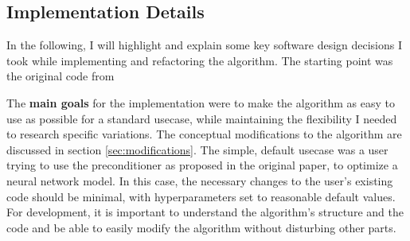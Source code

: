 \documentclass[twoside,12pt,a4paper]{report}
\begin{document}
\subsection{Implementation Details} \label{sec:implementation}
In the following, I will highlight and explain some key software design decisions I took while implementing and refactoring the algorithm. The starting point was the original code from \cite{roos2019active}

The \textbf{main goals} for the implementation were to make the algorithm as easy to use as possible for a standard usecase, while maintaining the flexibility I needed to research specific variations. The conceptual modifications to the algorithm are discussed in section \ref{sec:modifications}. The simple, default usecase was a user trying to use the preconditioner as proposed in the original paper, to optimize a neural network model. In this case, the necessary changes to the user's existing code should be minimal, with hyperparameters set to reasonable default values. For development, it is important to understand the algorithm's structure and the code and be able to easily modify the algorithm without disturbing other parts.
\end{document}
